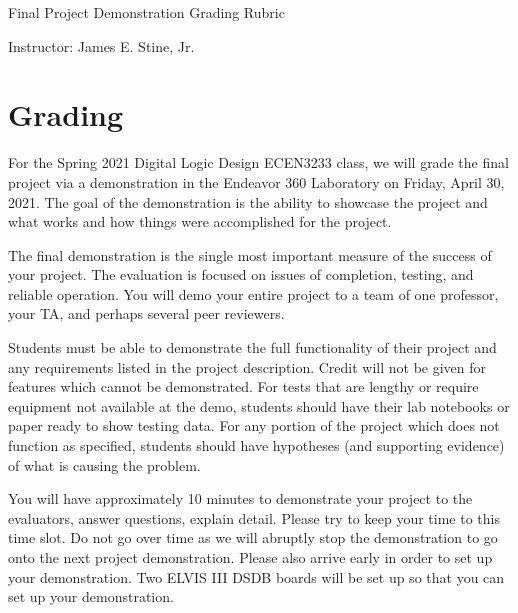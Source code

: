 \documentclass{article}
\newcommand{\myassignment}{Final Project Demonstration Grading Rubric }
\newcommand{\myinstructor}{Instructor: James E. Stine, Jr.}
\begin{document}
\begin{center}
  {\huge \myassignment} \\
  \begin{flushright}
  \myinstructor \\
  \end{flushright}
\end{center}

\section{Grading}

For the Spring 2021 Digital Logic Design ECEN3233 class, we will grade
the final 
project via a demonstration in the Endeavor 360 Laboratory on Friday,
April 30, 2021.  The goal of the demonstration is the ability to
showcase the project and what works and how things were accomplished
for the project.

The final demonstration is the single most important measure of the
success of your project. The evaluation is focused on issues of
completion, testing, and reliable operation. You will demo your entire
project to a team of one professor, your TA, and perhaps several peer
reviewers.

Students must be able to demonstrate the full functionality of their
project and any requirements listed in the project description.
Credit will not be given for features which
cannot be demonstrated. For tests that are lengthy or require
equipment not available at the demo, students should have their lab
notebooks or paper ready to show testing data. For any portion of the project
which does not function as specified, students should have hypotheses
(and supporting evidence) of what is causing the problem.

You will have approximately 10 minutes to demonstrate your project to
the evaluators, answer questions, explain detail.  Please try to keep
your time to this time slot.  Do not go over time as we will abruptly
stop the demonstration to go onto the next project demonstration.
Please also arrive early in order to set up your demonstration.  Two
ELVIS III DSDB boards will be set up so that you can set up your
demonstration. 
\end{document}
